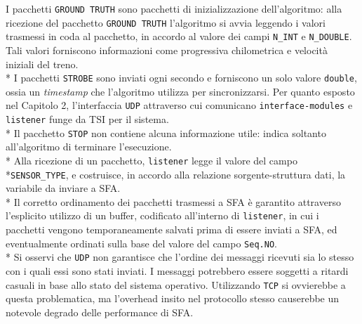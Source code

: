 I pacchetti \texttt{GROUND TRUTH} sono pacchetti di inizializzazione dell'algoritmo: alla ricezione del pacchetto \texttt{GROUND TRUTH} l'algoritmo si avvia leggendo i valori trasmessi in coda al pacchetto, in accordo al valore dei campi \texttt{N\_INT} e \texttt{N\_DOUBLE}. Tali valori forniscono informazioni come progressiva chilometrica e velocit\`a iniziali del treno.\\*
I pacchetti \texttt{STROBE} sono inviati ogni secondo e forniscono un solo valore \texttt{double}, ossia un \emph{timestamp} che l'algoritmo utilizza per sincronizzarsi. Per quanto esposto nel Capitolo 2, l'interfaccia \texttt{UDP} attraverso cui comunicano \texttt{interface-modules} e \texttt{listener} funge da TSI per il sistema.\\*
Il pacchetto \texttt{STOP} non contiene alcuna informazione utile: indica soltanto all'algoritmo di terminare l'esecuzione.\\*
Alla ricezione di un pacchetto, \texttt{listener} legge il valore del campo\\*\texttt{SENSOR\_TYPE}, e costruisce, in accordo alla relazione sorgente-struttura dati, la variabile da inviare a SFA.\\*
Il corretto ordinamento dei pacchetti trasmessi a SFA \`e garantito attraverso l'esplicito utilizzo di un buffer, codificato all'interno di \texttt{listener}, in cui i pacchetti vengono temporaneamente salvati prima di essere inviati a SFA, ed eventualmente ordinati sulla base del valore del campo \texttt{Seq.NO}.\\*
Si osservi che \texttt{UDP} non garantisce che l'ordine dei messaggi ricevuti sia lo stesso con i quali essi sono stati inviati. I messaggi potrebbero essere soggetti a ritardi casuali in base allo stato del sistema operativo. Utilizzando \texttt{TCP} si ovvierebbe a questa problematica, ma l'overhead insito nel protocollo stesso causerebbe un notevole degrado delle performance di SFA.
